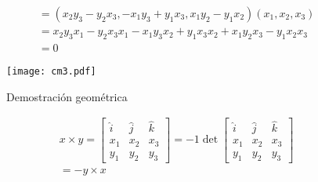 \begin{exercise}[Propiedades de ortogonalidad $(x\times y)\cdot x=0$]
	\begin{align*}
		 & =\left( x_2y_3-y_2x_3,-x_1y_3+y_1x_3,x_1y_2-y_1x_2  \right)\left(x_1,x_2,x_3\right) \\
		 & =x_2y_3x_1-y_2x_3x_1-x_1y_3x_2+y_1x_3x_2+x_1y_2x_3-y_1x_2x_3                        \\
		 & =0
	\end{align*}
\end{exercise}


\begin{figure}[h!]
	\centering
	\texttt{[image: cm3.pdf]}
	\caption{Demostración geométrica}
\end{figure}

\begin{exercise}[Si $x,y\in \R^3\implies x\times y=-y\times x$]
	\begin{align*}
		 & x\times y= \begin{bmatrix}
			              \hat{i} & \hat{j} & \hat{k} \\
			              x_1     & x_2     & x_3     \\
			              y_1     & y_2     & y_3
		              \end{bmatrix}=-1\det\begin{bmatrix}
			                                  \hat{i} & \hat{j} & \hat{k} \\
			                                  x_1     & x_2     & x_3     \\
			                                  y_1     & y_2     & y_3
		                                  \end{bmatrix} \\
		 & =-y\times x
	\end{align*}
\end{exercise}

